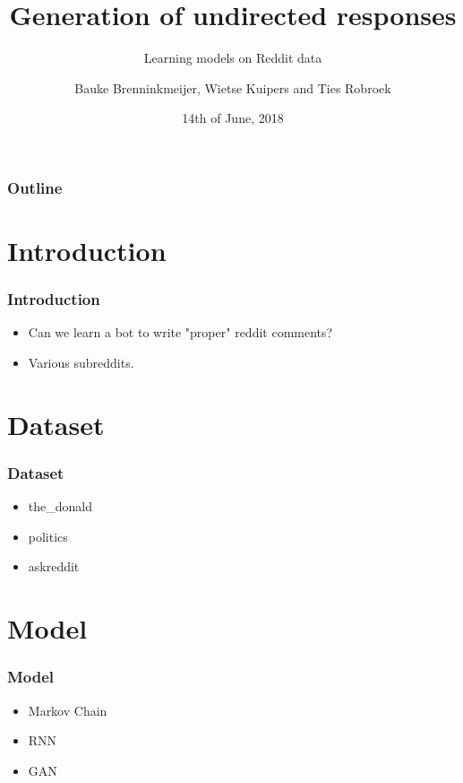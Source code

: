 \documentclass{beamer}
\title[Generation of undirected responses]{
  Generation of undirected responses}
\subtitle{Learning models on Reddit data}
\author[Group 7]{
  Bauke Brenninkmeijer, Wietse Kuipers and Ties Robroek}
\institute[Radboud University Nijmegen]{
  Institute for Computing and Information Sciences \\
  Radboud University Nijmegen}
\date[14th of June, 2018]{
  14th of June, 2018}
\begin{document}
\begin{frame}
  \titlepage
\end{frame}

\begin{frame}
  \frametitle{Outline}

  \tableofcontents
\end{frame}

\section{Introduction}

\begin{frame}
  \frametitle{Introduction}

  \begin{itemize}
    \item Can we learn a bot to write "proper" reddit comments?
    \item Various subreddits.
  \end{itemize}
\end{frame}

\section{Dataset}

\begin{frame}
  \frametitle{Dataset}

  \begin{itemize}
    \item the\_donald
    \item politics
    \item askreddit
  \end{itemize}
\end{frame}



\section{Model}

\begin{frame}
  \frametitle{Model}

  \begin{itemize}
    \item Markov Chain
    \item RNN
    \item GAN
  \end{itemize}
\end{frame}
\end{document}
